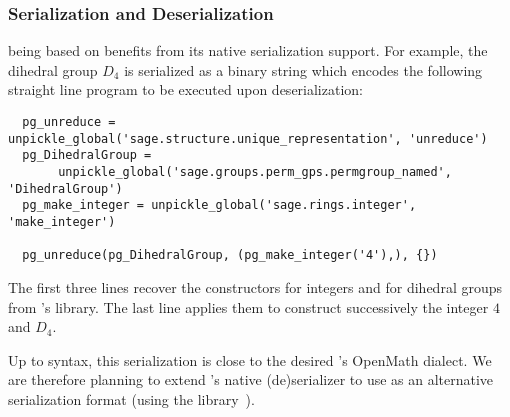 
\subsubsection{Serialization and Deserialization}

\Sage being based on \Python benefits from its native serialization
support. For example, the dihedral group $D_4$ is serialized as a
binary string which encodes the following straight line program to be
executed upon deserialization:
\begin{lstlisting}
  pg_unreduce = unpickle_global('sage.structure.unique_representation', 'unreduce')
  pg_DihedralGroup = 
       unpickle_global('sage.groups.perm_gps.permgroup_named', 'DihedralGroup')
  pg_make_integer = unpickle_global('sage.rings.integer', 'make_integer')

  pg_unreduce(pg_DihedralGroup, (pg_make_integer('4'),), {})
\end{lstlisting}
The first three lines recover the constructors for integers and for
dihedral groups from \Sage's library. The last line applies them to
construct successively the integer $4$ and $D_4$.

Up to syntax, this serialization is close to the desired \Sage's
OpenMath dialect.
We are therefore planning to extend \Python's native (de)serializer to
use \OMMT as an alternative serialization format  (using the \Python library~\cite{py-openmath:on}).

